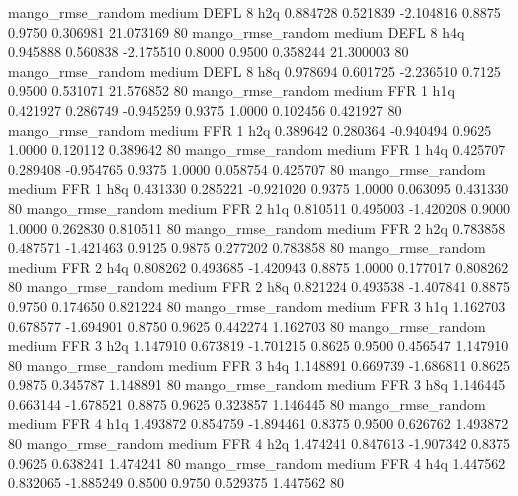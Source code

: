 mango_rmse_random     medium     DEFL                 8                  h2q  0.884728 0.521839 -2.104816 0.8875 0.9750  0.306981   21.073169 80
mango_rmse_random     medium     DEFL                 8                  h4q  0.945888 0.560838 -2.175510 0.8000 0.9500  0.358244   21.300003 80
mango_rmse_random     medium     DEFL                 8                  h8q  0.978694 0.601725 -2.236510 0.7125 0.9500  0.531071   21.576852 80
mango_rmse_random     medium      FFR                 1                  h1q  0.421927 0.286749 -0.945259 0.9375 1.0000  0.102456    0.421927 80
mango_rmse_random     medium      FFR                 1                  h2q  0.389642 0.280364 -0.940494 0.9625 1.0000  0.120112    0.389642 80
mango_rmse_random     medium      FFR                 1                  h4q  0.425707 0.289408 -0.954765 0.9375 1.0000  0.058754    0.425707 80
mango_rmse_random     medium      FFR                 1                  h8q  0.431330 0.285221 -0.921020 0.9375 1.0000  0.063095    0.431330 80
mango_rmse_random     medium      FFR                 2                  h1q  0.810511 0.495003 -1.420208 0.9000 1.0000  0.262830    0.810511 80
mango_rmse_random     medium      FFR                 2                  h2q  0.783858 0.487571 -1.421463 0.9125 0.9875  0.277202    0.783858 80
mango_rmse_random     medium      FFR                 2                  h4q  0.808262 0.493685 -1.420943 0.8875 1.0000  0.177017    0.808262 80
mango_rmse_random     medium      FFR                 2                  h8q  0.821224 0.493538 -1.407841 0.8875 0.9750  0.174650    0.821224 80
mango_rmse_random     medium      FFR                 3                  h1q  1.162703 0.678577 -1.694901 0.8750 0.9625  0.442274    1.162703 80
mango_rmse_random     medium      FFR                 3                  h2q  1.147910 0.673819 -1.701215 0.8625 0.9500  0.456547    1.147910 80
mango_rmse_random     medium      FFR                 3                  h4q  1.148891 0.669739 -1.686811 0.8625 0.9875  0.345787    1.148891 80
mango_rmse_random     medium      FFR                 3                  h8q  1.146445 0.663144 -1.678521 0.8875 0.9625  0.323857    1.146445 80
mango_rmse_random     medium      FFR                 4                  h1q  1.493872 0.854759 -1.894461 0.8375 0.9500  0.626762    1.493872 80
mango_rmse_random     medium      FFR                 4                  h2q  1.474241 0.847613 -1.907342 0.8375 0.9625  0.638241    1.474241 80
mango_rmse_random     medium      FFR                 4                  h4q  1.447562 0.832065 -1.885249 0.8500 0.9750  0.529375    1.447562 80
